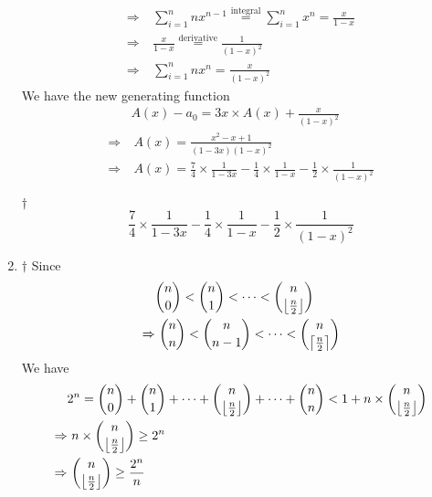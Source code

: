 \documentclass[a4paper,12pt]{article}
\begin{document}
\begin{enumerate}
\begin{equation}
\begin{aligned}
			\Rightarrow & \ \sum_{i = 1}^n nx^{n - 1} \overset{\text{integral}}= \sum_{i = 1}^n x^n = \frac{x}{1 - x} \\
			\Rightarrow & \ \frac{x}{1 - x} \overset{\text{derivative}}= \frac{1}{(1 - x)^2} \\ 
			\Rightarrow & \ \sum_{i = 1}^n nx^n = \frac{x}{(1 - x)^2}
		\end{aligned}
	\end{equation} We have the new generating function \begin{equation}
		\begin{aligned}
			& A(x) - a_0 = 3x \times A(x) + \frac{x}{(1 - x)^2} \\
			\Rightarrow & \ A(x) = \frac{x^2 - x  + 1}{(1 - 3x)(1 - x)^2} \\
			\Rightarrow & \ A(x) = \frac{7}{4} \times \frac{1}{1 - 3x} - \frac{1}{4} \times \frac{1}{1 - x} - \frac{1}{2} \times \frac{1}{(1 - x)^2}
		\end{aligned}
	\end{equation}
	\begin{answer}{$\dag$} \begin{equation}
			\frac{7}{4} \times \frac{1}{1 - 3x} - \frac{1}{4} \times \frac{1}{1 - x} - \frac{1}{2} \times \frac{1}{(1 - x)^2}
		\end{equation}
	\end{answer}
	\item \begin{answer}{$\dag$}
		Since \begin{equation}
			\begin{aligned}
				& \binom{n}{0} < \binom{n}{1} < \cdots < \binom{n}{\floor*{\frac{n}{2}}} \\
				\Rightarrow & \ \binom{n}{n} < \binom{n}{n - 1} < \cdots < \binom{n}{\ceil*{\frac{n}{2}}}
			\end{aligned}
		\end{equation} We have \begin{equation}
			\begin{aligned}
				& 2^n = \binom{n}{0} + \binom{n}{1} + \cdots + \binom{n}{\floor*{\frac{n}{2}}} + \cdots + \binom{n}{n} < 1 + n \times \binom{n}{\floor*{\frac{n}{2}}} \\
				\Rightarrow & \ n \times \binom{n}{\floor*{\frac{n}{2}}} \ge 2^n \\
				\Rightarrow & \ \binom{n}{\floor*{\frac{n}{2}}} \ge \frac{2^n}{n}
			\end{aligned}
		\end{equation}
	\end{answer}

\end{enumerate}
\end{document}
